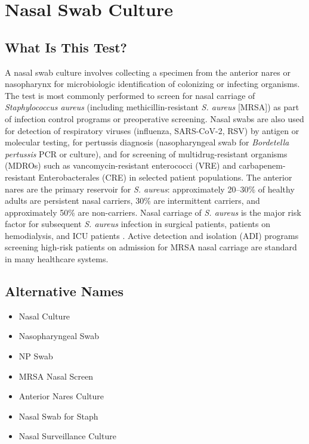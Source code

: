 \chapter{Nasal Swab Culture}

\section*{What Is This Test?}
A nasal swab culture involves collecting a specimen from the anterior nares or nasopharynx for microbiologic identification of colonizing or infecting organisms. The test is most commonly performed to screen for nasal carriage of \textit{Staphylococcus aureus} (including methicillin-resistant \textit{S. aureus} [MRSA]) as part of infection control programs or preoperative screening. Nasal swabs are also used for detection of respiratory viruses (influenza, SARS-CoV-2, RSV) by antigen or molecular testing, for pertussis diagnosis (nasopharyngeal swab for \textit{Bordetella pertussis} PCR or culture), and for screening of multidrug-resistant organisms (MDROs) such as vancomycin-resistant enterococci (VRE) and carbapenem-resistant Enterobacterales (CRE) in selected patient populations. The anterior nares are the primary reservoir for \textit{S. aureus}: approximately 20--30\% of healthy adults are persistent nasal carriers, 30\% are intermittent carriers, and approximately 50\% are non-carriers. Nasal carriage of \textit{S. aureus} is the major risk factor for subsequent \textit{S. aureus} infection in surgical patients, patients on hemodialysis, and ICU patients \cite{wertheim2005role}. Active detection and isolation (ADI) programs screening high-risk patients on admission for MRSA nasal carriage are standard in many healthcare systems.

\section*{Alternative Names}
\begin{itemize}
  \item Nasal Culture
  \item Nasopharyngeal Swab
  \item NP Swab
  \item MRSA Nasal Screen
  \item Anterior Nares Culture
  \item Nasal Swab for Staph
  \item Nasal Surveillance Culture
\end{itemize}
